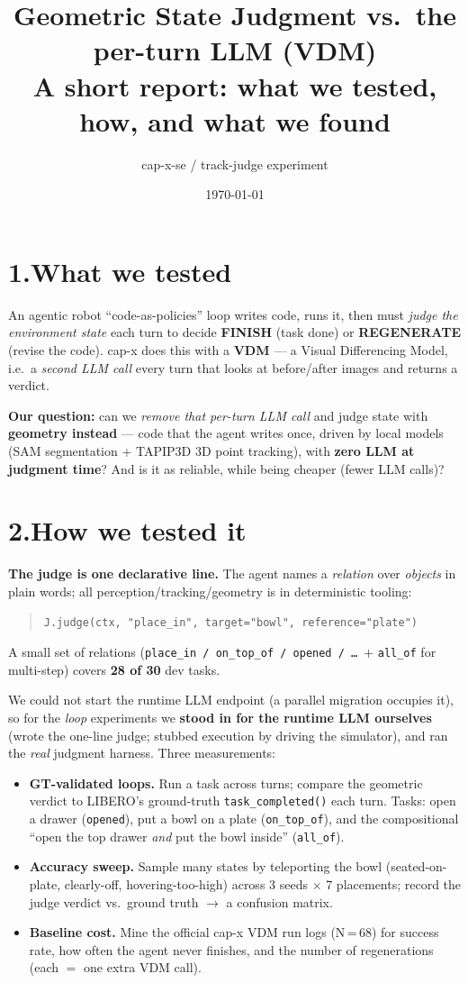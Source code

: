 \documentclass[11pt]{article}
\title{\textbf{Geometric State Judgment vs.\ the per-turn LLM (VDM)\\
\large A short report: what we tested, how, and what we found}}
\author{cap-x-se / track-judge experiment}
\date{\today}
\begin{document}
\maketitle

\section*{1.\quad What we tested}

An agentic robot ``code-as-policies'' loop writes code, runs it, then must \emph{judge the
environment state} each turn to decide \textbf{FINISH} (task done) or \textbf{REGENERATE}
(revise the code). cap-x does this with a \textbf{VDM} --- a Visual Differencing Model, i.e.\ a
\emph{second LLM call} every turn that looks at before/after images and returns a verdict.

\textbf{Our question:} can we \emph{remove that per-turn LLM call} and judge state with
\textbf{geometry instead} --- code that the agent writes once, driven by local models
(SAM segmentation + TAPIP3D 3D point tracking), with \textbf{zero LLM at judgment time}? And
is it as reliable, while being cheaper (fewer LLM calls)?

\section*{2.\quad How we tested it}

\textbf{The judge is one declarative line.} The agent names a \emph{relation} over
\emph{objects} in plain words; all perception/tracking/geometry is in deterministic tooling:
\begin{quote}\small\texttt{J.judge(ctx, "place\_in", target="bowl", reference="plate")}\end{quote}
A small set of relations (\texttt{place\_in / on\_top\_of / opened / \dots}\ + \texttt{all\_of}
for multi-step) covers \textbf{28 of 30} dev tasks.

We could not start the runtime LLM endpoint (a parallel migration occupies it), so for the
\emph{loop} experiments we \textbf{stood in for the runtime LLM ourselves} (wrote the one-line
judge; stubbed execution by driving the simulator), and ran the \emph{real} judgment harness.
Three measurements:

\begin{itemize}\itemsep2pt
\item \textbf{GT-validated loops.} Run a task across turns; compare the geometric verdict to
LIBERO's ground-truth \texttt{task\_completed()} each turn. Tasks: open a drawer (\texttt{opened}),
put a bowl on a plate (\texttt{on\_top\_of}), and the compositional ``open the top drawer
\emph{and} put the bowl inside'' (\texttt{all\_of}).
\item \textbf{Accuracy sweep.} Sample many states by teleporting the bowl (seated-on-plate,
clearly-off, hovering-too-high) across 3 seeds $\times$ 7 placements; record the judge verdict
vs.\ ground truth $\to$ a confusion matrix.
\item \textbf{Baseline cost.} Mine the official cap-x VDM run logs (N\,=\,68) for success rate,
how often the agent never finishes, and the number of regenerations (each $=$ one extra VDM call).
\end{itemize}
\end{document}
